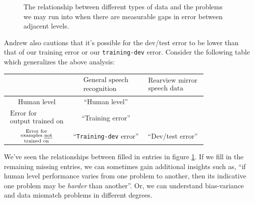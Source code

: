 \documentclass[12pt]{article}
\begin{document}
\begin{figure}[h]
\centering
\label{fig: relationshipsbwdifferrs}
\caption{The relationship between different types of data and the problems we may run into when there are measurable gaps in error between adjacent levels.}
\end{figure}

Andrew also cautions that it's possible for the dev/test error to be lower than that of our training error or our \texttt{training-dev} error. Consider the following table which generalizes the above analysis:
\begin{table}[h]
\centering
\begin{tabular}{c| c c }
 & $\substack{\textrm{General speech} \\ \textrm{recognition}}$ & $\substack{\textrm{Rearview mirror} \\ \textrm{speech data}}$ \\
\hline
Human level & ``Human level'' & \\
$\substack{\textrm{Error for} \\ \textrm{output trained on}}$ & ``Training error'' & \\
$\substack{\textrm{Error for} \\ \textrm{examples \uline{not}} \\ \textrm{trained on}}$ & ``\texttt{Training-dev} error'' & ``Dev/test error''\\ \end{tabular}
\end{table}

We've seen the relationships between filled in entries in figure \ref{fig: relationshipsbwdifferrs}. If we fill in the remaining missing entries, we can sometimes gain additional insights such as, ``if human level performance varies from one problem to another, then its indicative one problem may be \emph{harder} than another''. Or, we can understand bias-variance and data mismatch problems in different degrees.
\end{document}
